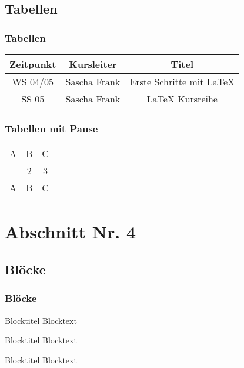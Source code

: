 \documentclass[hyperref={pdfpagelabels=false}]{beamer}
\begin{document}
\subsection{Tabellen}
\begin{frame}
\frametitle{Tabellen}
\begin{tabular}{|c|c|c|}
\hline
\textbf{Zeitpunkt} & \textbf{Kursleiter} & \textbf{Titel} \\
\hline
WS 04/05 & Sascha Frank &  Erste Schritte mit \LaTeX{}  \\
\hline
SS 05 & Sascha Frank & \LaTeX{} Kursreihe \\
\hline
\end{tabular}
\end{frame}


\begin{frame}
\frametitle{Tabellen mit Pause}
\begin{tabular}{c c c}
A & B & C \\ 
\pause 
1 & 2 & 3 \\  
\pause 
A & B & C \\ 
\end{tabular} 
\end{frame}


\section{Abschnitt Nr. 4}
\subsection{Bl\"ocke}
\begin{frame}
\frametitle{Bl\"ocke}

\begin{block}{Blocktitel}
Blocktext 
\end{block}

\begin{exampleblock}{Blocktitel}
Blocktext 
\end{exampleblock}


\begin{alertblock}{Blocktitel}
Blocktext 
\end{alertblock}
\end{frame}
\end{document}
